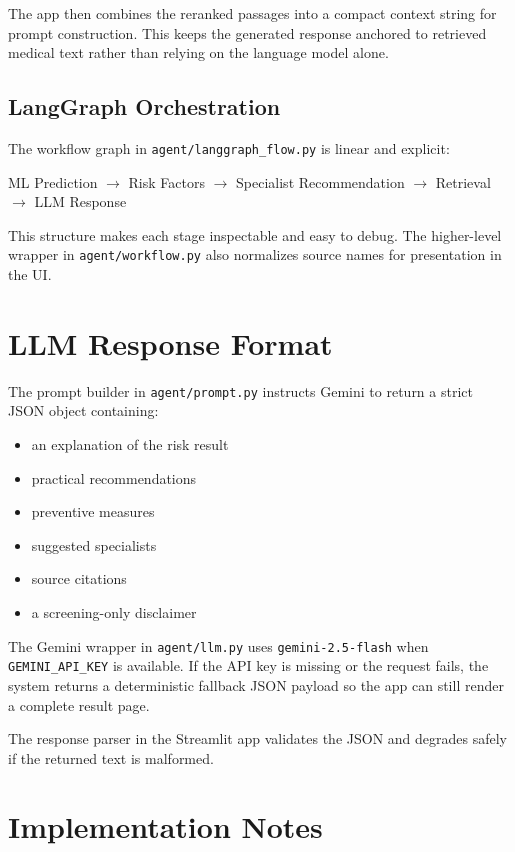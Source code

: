 \documentclass[12pt]{article}
\begin{document}
The app then combines the reranked passages into a compact context string for prompt construction. This keeps the generated response anchored to retrieved medical text rather than relying on the language model alone.

\subsection*{LangGraph Orchestration}

The workflow graph in \texttt{agent/langgraph\_flow.py} is linear and explicit:

\begin{center}
ML Prediction $\rightarrow$ Risk Factors $\rightarrow$ Specialist Recommendation $\rightarrow$ Retrieval $\rightarrow$ LLM Response
\end{center}

This structure makes each stage inspectable and easy to debug. The higher-level wrapper in \texttt{agent/workflow.py} also normalizes source names for presentation in the UI.

\section{LLM Response Format}

The prompt builder in \texttt{agent/prompt.py} instructs Gemini to return a strict JSON object containing:

\begin{itemize}
\item an explanation of the risk result
\item practical recommendations
\item preventive measures
\item suggested specialists
\item source citations
\item a screening-only disclaimer
\end{itemize}

The Gemini wrapper in \texttt{agent/llm.py} uses \texttt{gemini-2.5-flash} when \texttt{GEMINI\_API\_KEY} is available. If the API key is missing or the request fails, the system returns a deterministic fallback JSON payload so the app can still render a complete result page.

The response parser in the Streamlit app validates the JSON and degrades safely if the returned text is malformed.

\section{Implementation Notes}
\end{document}
